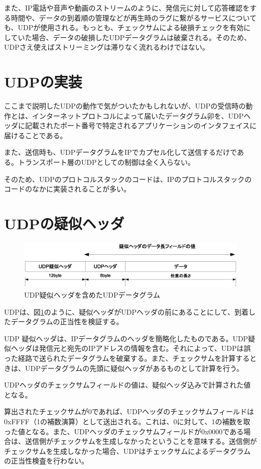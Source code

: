 また、IP電話や音声や動画のストリームのように、発信元に対して応答確認をする時間や、データの到着順の管理などが再生時のラグに繋がるサービスについても、UDPが使用される。もっとも、チェックサムによる破損チェックを有効にしていた場合、データの破損したUDPデータグラムは破棄される。そのため、UDPさえ使えばストリーミングは滞りなく流れるわけではない。


\section{UDPの実装}
ここまで説明したUDPの動作で気がついたかもしれないが、UDPの受信時の動作とは、インターネットプロトコルによって届いたデータグラム卯を、UDPヘッダに記載されたポート番号で特定されるアプリケーションのインタフェイスに届けることである。

また、送信時も、UDPデータグラムをIPでカプセル化して送信するだけである。トランスポート層のUDPとしての制御は全く入らない。

そのため、UDPのプロトコルスタックのコードは、IPのプロトコルスタックのコードのなかに実装されることが多い。

\section{UDPの疑似ヘッダ}

\begin{figure}[htbp]
	\includegraphics[width=12cm,clip]{draw/udppseudoheader.eps}
	\caption{UDP疑似ヘッダを含めたUDPデータグラム}
	\label{fig:udppseudoheader}
\end{figure}


UDPは、図\ref{fig:udppseudoheader}のように、疑似ヘッダがUDPヘッダの前にあることにして、到着したデータグラムの正当性を検証する。

UDP 疑似ヘッダは、IPデータグラムのヘッダを簡略化したものである。UDP疑似ヘッダは発信元と宛先のIPアドレスの情報を含む。それによって、UDPは誤った経路で送られたデータグラムを破棄する。また、チェックサムを計算するときは、UDPデータグラムの先頭に疑似ヘッダがあるものとして計算を行う。

UDPヘッダのチェックサムフィールドの値は、疑似ヘッダ込みで計算された値となる。


算出されたチェックサムが0であれば、UDPヘッダのチェックサムフィールドは0xFFFF（1の補数演算）として送出される。これは、0に対して、1の補数を取った値となる。また、UDPヘッダのチェックサムフィールドが0x0000である場合は、送信側がチェックサムを生成しなかったということを意味する。送信側がチェックサムを生成しなかった場合、UDPはチェックサムによるデータグラムの正当性検査を行わない。

